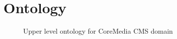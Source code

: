\chapter{Ontology}

%
%

\begin{figure}%
  \caption[Upper level domain specific ontology]%
          {Upper level ontology for CoreMedia \gls{CMS} domain}
  \label{appendix:ontology}
\end{figure}

